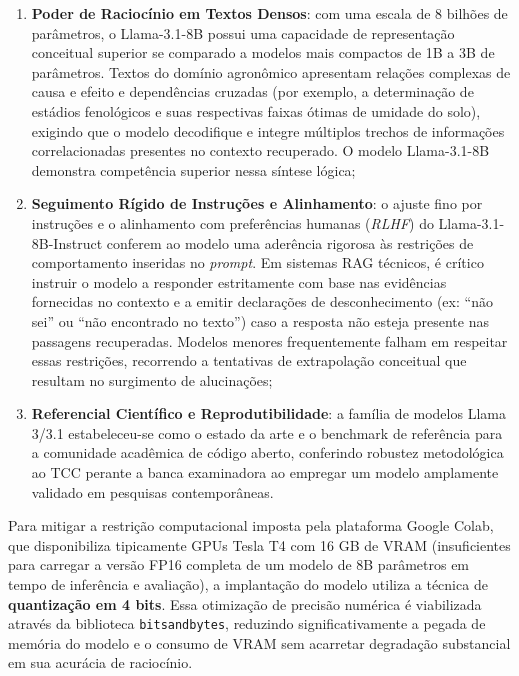 \documentclass[
	12pt,				%
	openright,			%
	oneside,			%
	a4paper,			%
	tccpreliminar,		%
	]{ABNT-DC-UEL}
\begin{document}
\begin{enumerate}
    \item \textbf{Poder de Raciocínio em Textos Densos}: com uma escala de 8 bilhões de parâmetros, o Llama-3.1-8B possui uma capacidade de representação conceitual superior se comparado a modelos mais compactos de 1B a 3B de parâmetros. Textos do domínio agronômico apresentam relações complexas de causa e efeito e dependências cruzadas (por exemplo, a determinação de estádios fenológicos e suas respectivas faixas ótimas de umidade do solo), exigindo que o modelo decodifique e integre múltiplos trechos de informações correlacionadas presentes no contexto recuperado. O modelo Llama-3.1-8B demonstra competência superior nessa síntese lógica;
    
    \item \textbf{Seguimento Rígido de Instruções e Alinhamento}: o ajuste fino por instruções e o alinhamento com preferências humanas (\textit{RLHF}) do Llama-3.1-8B-Instruct conferem ao modelo uma aderência rigorosa às restrições de comportamento inseridas no \textit{prompt}. Em sistemas RAG técnicos, é crítico instruir o modelo a responder estritamente com base nas evidências fornecidas no contexto e a emitir declarações de desconhecimento (ex: ``não sei'' ou ``não encontrado no texto'') caso a resposta não esteja presente nas passagens recuperadas. Modelos menores frequentemente falham em respeitar essas restrições, recorrendo a tentativas de extrapolação conceitual que resultam no surgimento de alucinações;
    
    \item \textbf{Referencial Científico e Reprodutibilidade}: a família de modelos Llama 3/3.1 estabeleceu-se como o estado da arte e o benchmark de referência para a comunidade acadêmica de código aberto, conferindo robustez metodológica ao TCC perante a banca examinadora ao empregar um modelo amplamente validado em pesquisas contemporâneas.
\end{enumerate}

Para mitigar a restrição computacional imposta pela plataforma Google Colab, que disponibiliza tipicamente GPUs Tesla T4 com 16 GB de VRAM (insuficientes para carregar a versão FP16 completa de um modelo de 8B parâmetros em tempo de inferência e avaliação), a implantação do modelo utiliza a técnica de \textbf{quantização em 4 bits}. Essa otimização de precisão numérica é viabilizada através da biblioteca \texttt{bitsandbytes}, reduzindo significativamente a pegada de memória do modelo e o consumo de VRAM sem acarretar degradação substancial em sua acurácia de raciocínio.
\end{document}
